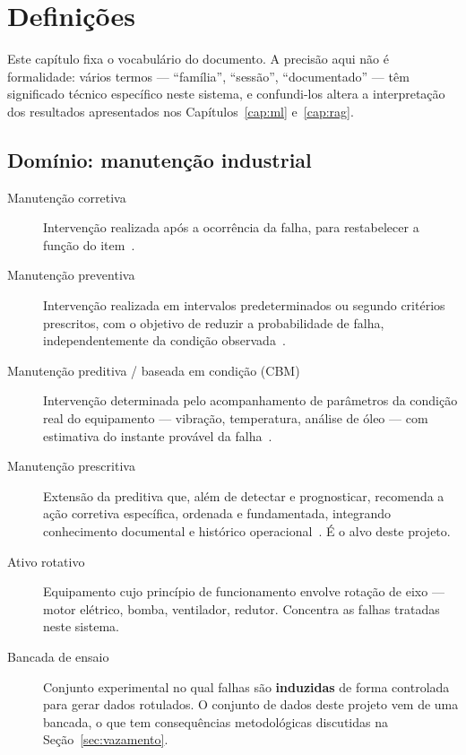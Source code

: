 \chapter{Definições}
\label{cap:definicoes}

Este capítulo fixa o vocabulário do documento. A precisão aqui não é
formalidade: vários termos --- \enquote{família}, \enquote{sessão},
\enquote{documentado} --- têm significado técnico específico neste sistema, e
confundi-los altera a interpretação dos resultados apresentados nos
Capítulos~\ref{cap:ml} e~\ref{cap:rag}.

\section{Domínio: manutenção industrial}

\begin{description}
  \item[Manutenção corretiva] Intervenção realizada após a ocorrência da
    falha, para restabelecer a função do item~\cite{abnt5462}.

  \item[Manutenção preventiva] Intervenção realizada em intervalos
    predeterminados ou segundo critérios prescritos, com o objetivo de reduzir a
    probabilidade de falha, independentemente da condição
    observada~\cite{abnt5462}.

  \item[Manutenção preditiva / baseada em condição (CBM)] Intervenção
    determinada pelo acompanhamento de parâmetros da condição real do
    equipamento --- vibração, temperatura, análise de óleo --- com estimativa do
    instante provável da falha~\cite{iso17359, jardine2006review}.

  \item[Manutenção prescritiva] Extensão da preditiva que, além de detectar e
    prognosticar, recomenda a ação corretiva específica, ordenada e
    fundamentada, integrando conhecimento documental e histórico
    operacional~\cite{ansari2019prima}. É o alvo deste projeto.

  \item[Ativo rotativo] Equipamento cujo princípio de funcionamento envolve
    rotação de eixo --- motor elétrico, bomba, ventilador, redutor. Concentra as
    falhas tratadas neste sistema.

  \item[Bancada de ensaio] Conjunto experimental no qual falhas são
    \textbf{induzidas} de forma controlada para gerar dados rotulados. O
    conjunto de dados deste projeto vem de uma bancada, o que tem consequências
    metodológicas discutidas na Seção~\ref{sec:vazamento}.
\end{description}

